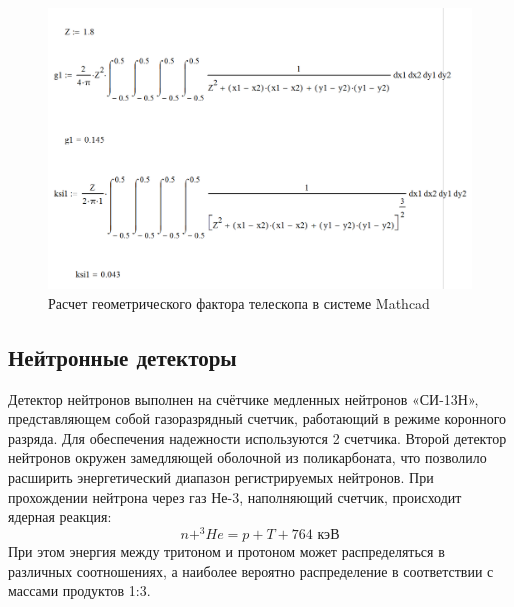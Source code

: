 \begin{figure}[h!]
\centering
\includegraphics[width=0.7\linewidth]{images/mathcadGeomfactor1}
\caption{ Расчет геометрического фактора телескопа в системе Mathcad}
\label{fig:mathcadGeomfactor}
\end{figure}





\subsection{Нейтронные детекторы}

Детектор нейтронов выполнен на счётчике медленных нейтронов «СИ-13Н», представляющем собой газоразрядный  счетчик, работающий в режиме коронного разряда. Для обеспечения надежности используются 2 счетчика. Второй детектор нейтронов окружен замедляющей оболочной из поликарбоната, что позволило расширить энергетический диапазон регистрируемых нейтронов. При прохождении нейтрона через газ Не-3, наполняющий счетчик, происходит ядерная реакция:
\[ n+^3\!He = p+T+764 \textrm{ кэВ}\]
При этом энергия между тритоном и протоном может распределяться в различных соотношениях, а наиболее вероятно распределение в соответствии с массами продуктов 1:3.


